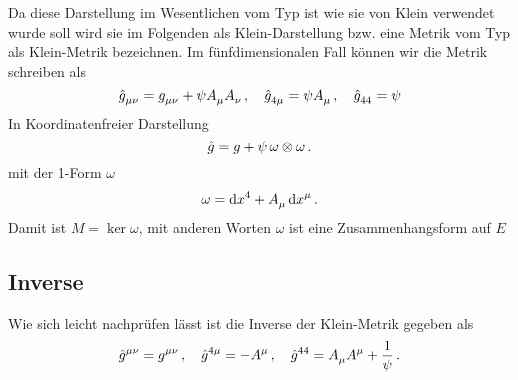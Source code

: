 Da diese Darstellung im Wesentlichen vom Typ ist wie sie von Klein verwendet
wurde soll wird sie im Folgenden als Klein-Darstellung bzw. eine Metrik vom Typ
als Klein-Metrik bezeichnen.
Im fünfdimensionalen Fall können wir die Metrik schreiben als
\begin{equation}
\tensor{\fived{g}}{_\mu_\nu}=\tensor{g}{_\mu_\nu}+\psi\tensor*{A}{_\mu}\tensor*{A}{_\nu}\,,\quad
\tensor{\fived{g}}{_4_\mu}=\psi\tensor*{A}{_\mu}\,,\quad
\tensor{\fived{g}}{_4_4}=\psi
\end{equation}
In Koordinatenfreier Darstellung
\begin{equation}
\hat{g}=g+\psi\,\omega\otimes\omega\,.
\end{equation} 
mit der 
1-Form $\omega$
\begin{equation}
\omega=\dif\tensor{x}{^4}+\tensor{A}{_\mu}\dif\tensor{x}{^\mu}\,.
\end{equation}
Damit ist $M=\ker \omega$, mit anderen Worten $\omega$ ist eine
Zusammenhangsform auf $E$
\subsection{Inverse}
Wie sich leicht nachprüfen lässt ist die Inverse der Klein-Metrik gegeben als
\begin{equation}
\tensor{\fived{g}}{^\mu^\nu}=\tensor{g}{^\mu^\nu}\,,\quad
\tensor{\fived{g}}{^4^\mu}=-\tensor{A}{^\mu}\,,\quad
\tensor{\fived{g}}{^4^4}=\tensor*{A}{_\mu}\tensor*{A}{^\mu}+\frac{1}{\psi}\,.
\end{equation}

